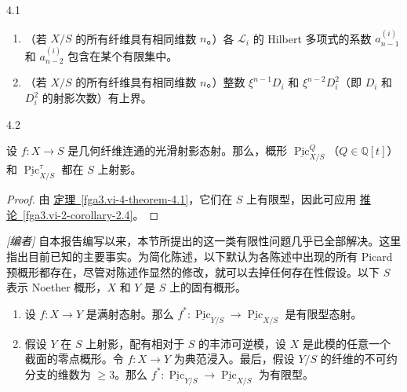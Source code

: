 \begin{theorem}{4.1}
\begin{enumerate}
    
 \item[b'.]（若 \(X/S\) 的所有纤维具有相同维数 \(n\)。）各 \(\mathscr {L}_i\) 的 Hilbert 多项式的系数 \(a_{n-1}^{(i)}\) 和 \(a_{n-2}^{(i)}\) 包含在某个有限集中。

    
 \item[b''.]（若 \(X/S\) 的所有纤维具有相同维数 \(n\)。）整数 \(\xi ^{n-1}D_i\) 和 \(\xi ^{n-2}D_i^2\)（即 \(D_i\) 和 \(D_i^2\) 的射影次数）有上界。

  \end{enumerate}\end{theorem}\begin{corollary}{4.2}\label{fga3.vi-4-corollary-4.2}\skipsinglepar\par{}设 \(f\colon  X\to  S\) 是几何纤维连通的光滑射影态射。那么，概形 \(\underline {\operatorname {Pic}}_{X/S}^Q\)（\(Q\in \mathbb {Q}[t]\)）和 \(\underline {\operatorname {Pic}}_{X/S}^\tau \) 都在 \(S\) 上射影。\begin{proof}\par{}由 \hyperref[fga3.vi-4-theorem-4.1]{定理~\ref*{fga3.vi-4-theorem-4.1}}，它们在 \(S\) 上有限型，因此可应用 \hyperref[fga3.vi-2-corollary-2.4]{推论~\ref*{fga3.vi-2-corollary-2.4}}。\end{proof}\end{corollary}\begin{remark}{}\label{fga3.vi-4-remark-comp}\skipsinglepar\par{}\emph{[编者]} 自本报告编写以来，本节所提出的这一类有限性问题几乎已全部解决。这里指出目前已知的主要事实。为简化陈述，以下默认为各陈述中出现的所有 Picard 预概形都存在，尽管对陈述作显然的修改，就可以去掉任何存在性假设。以下 \(S\) 表示 Noether 概形，\(X\) 和 \(Y\) 是 \(S\) 上的固有概形。\begin{enumerate}
      
 \item[i.]设 \(f\colon  X\to  Y\) 是满射态射。那么 \(f^*\colon \underline {\operatorname {Pic}}_{Y/S}\to \underline {\operatorname {Pic}}_{X/S}\) 是有限型态射。


      
 \item[ii.]假设 \(Y\) 在 \(S\) 上射影，配有相对于 \(S\) 的丰沛可逆模，设 \(X\) 是此模的任意一个截面的零点概形。令 \(f\colon  X\to  Y\) 为典范浸入。最后，假设 \(Y/S\) 的纤维的不可约分支的维数为 \(\geqslant 3\)。那么 \(f^*\colon \underline {\operatorname {Pic}}_{Y/S}\to \underline {\operatorname {Pic}}_{X/S}\) 为有限型。



\end{enumerate}
\end{remark}
